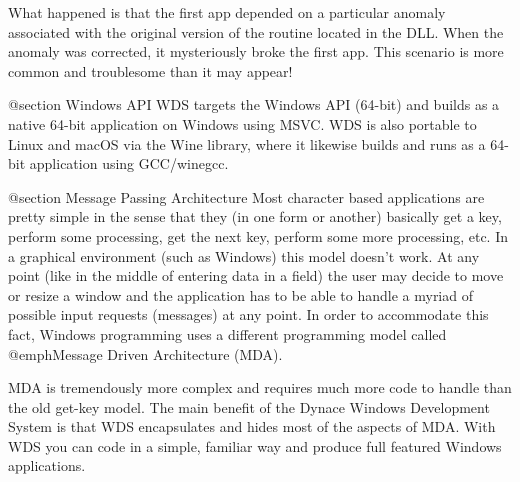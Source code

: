 What happened is that the first app depended on a particular anomaly
associated with the original version of the routine located in the DLL.
When the anomaly was corrected, it mysteriously broke the first app.
This scenario is more common and troublesome than it may appear!



@section Windows API
WDS targets the Windows API (64-bit) and builds as a native 64-bit
application on Windows using MSVC.  WDS is also portable to Linux and
macOS via the Wine library, where it likewise builds and runs as a
64-bit application using GCC/winegcc.

@section Message Passing Architecture
Most character based applications are pretty simple in the sense that
they (in one form or another) basically get a key, perform some processing,
get the next key, perform some more processing, etc.  In a graphical
environment (such as Windows) this model doesn't work.  At any point
(like in the middle of entering data in a field) the user may decide
to move or resize a window and the application has to be able to
handle a myriad of possible input requests (messages) at any point.
In order to accommodate this fact, Windows programming uses a different
programming model called @emph{Message Driven Architecture} (MDA).

MDA is tremendously more complex and requires much more code to handle
than the old get-key model.  The main benefit of the Dynace Windows
Development System is that WDS encapsulates and hides most of the
aspects of MDA.  With WDS you can code in a simple, familiar way and
produce full featured Windows applications.

